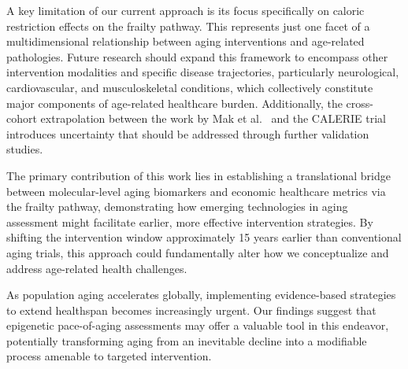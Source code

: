 A key limitation of our current approach is its focus specifically on caloric restriction effects on the frailty pathway. This represents just one facet of a multidimensional relationship between aging interventions and age-related pathologies. Future research should expand this framework to encompass other intervention modalities and specific disease trajectories, particularly neurological, cardiovascular, and musculoskeletal conditions, which collectively constitute major components of age-related healthcare burden. Additionally, the cross-cohort extrapolation between the work by Mak et al.~\cite{Mak2023} and the CALERIE trial introduces uncertainty that should be addressed through further validation studies.

The primary contribution of this work lies in establishing a translational bridge between molecular-level aging biomarkers and economic healthcare metrics via the frailty pathway, demonstrating how emerging technologies in aging assessment might facilitate earlier, more effective intervention strategies. By shifting the intervention window approximately 15 years earlier than conventional aging trials, this approach could fundamentally alter how we conceptualize and address age-related health challenges.

As population aging accelerates globally, implementing evidence-based strategies to extend healthspan becomes increasingly urgent. Our findings suggest that epigenetic pace-of-aging assessments may offer a valuable tool in this endeavor, potentially transforming aging from an inevitable decline into a modifiable process amenable to targeted intervention.